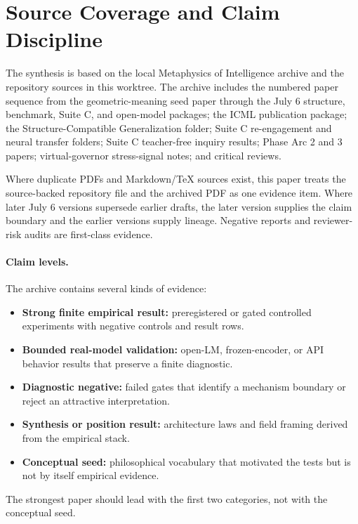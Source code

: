 \documentclass[11pt]{article}
\begin{document}
\section{Source Coverage and Claim Discipline}

The synthesis is based on the local Metaphysics of Intelligence archive and the
repository sources in this worktree. The archive includes the numbered paper
sequence from the geometric-meaning seed paper through the July 6 structure,
benchmark, Suite C, and open-model packages; the ICML publication package; the
Structure-Compatible Generalization folder; Suite C re-engagement and neural
transfer folders; Suite C teacher-free inquiry results; Phase Arc 2 and 3
papers; virtual-governor stress-signal notes; and critical reviews.

Where duplicate PDFs and Markdown/TeX sources exist, this paper treats the
source-backed repository file and the archived PDF as one evidence item. Where
later July 6 versions supersede earlier drafts, the later version supplies the
claim boundary and the earlier versions supply lineage. Negative reports and
reviewer-risk audits are first-class evidence.

\paragraph{Claim levels.}
The archive contains several kinds of evidence:

\begin{itemize}
  \item \textbf{Strong finite empirical result:} preregistered or gated
  controlled experiments with negative controls and result rows.
  \item \textbf{Bounded real-model validation:} open-LM, frozen-encoder, or API
  behavior results that preserve a finite diagnostic.
  \item \textbf{Diagnostic negative:} failed gates that identify a mechanism
  boundary or reject an attractive interpretation.
  \item \textbf{Synthesis or position result:} architecture laws and field
  framing derived from the empirical stack.
  \item \textbf{Conceptual seed:} philosophical vocabulary that motivated the
  tests but is not by itself empirical evidence.
\end{itemize}

The strongest paper should lead with the first two categories, not with the
conceptual seed.
\end{document}
